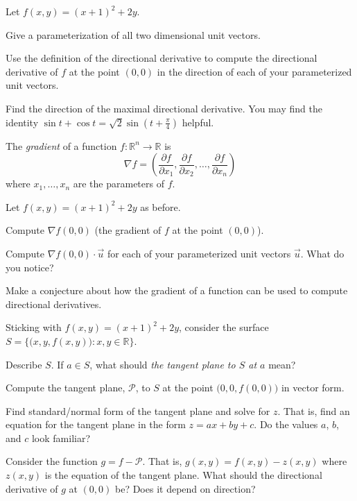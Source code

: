 \documentclass{problemset}
\newcommand{\R}{\mathbb{R}}
\begin{document}
	\question
	Let $f(x,y) = (x+1)^2+2y$.
	\begin{parts}
		\item Give a parameterization of all two dimensional unit vectors.
		\item Use the definition of the directional derivative to compute
			the directional derivative of $f$ at the point $(0,0)$ in the
			direction of each of your parameterized unit vectors.
		\item Find the direction of the maximal directional derivative.  You
			may find the identity $\sin t+\cos t = \sqrt{2}\sin(t+\tfrac{\pi}{4})$
			helpful.
	\end{parts}

	\begin{definition}[Gradient]
		The \emph{gradient} of a function $f:\R^n\to \R$ is
		\[
			\nabla f  = \left(
				\frac{\partial f}{\partial x_1}, 
				\frac{\partial f}{\partial x_2}, \ldots,
				\frac{\partial f}{\partial x_n}
			\right)
		\]
		where $x_1,\ldots, x_n$ are the parameters of $f$.
	\end{definition}
	
	\question
	Let $f(x,y) = (x+1)^2+2y$ as before.
	\begin{parts}
		\item Compute $\nabla f(0,0)$ (the gradient of $f$ at the point $(0,0)$).
		\item Compute $\nabla f(0,0)\cdot \vec u$ for each of your parameterized unit vectors $\vec u$.
			What do you notice?
		\item Make a conjecture about how the gradient of a function can be used to compute directional derivatives.
	\end{parts}

	\question
	Sticking with $f(x,y) = (x+1)^2+2y$, consider the surface $S=\{\big(x,y,f(x,y)\big):x,y\in\R\}$.
	\begin{parts}
		\item Describe $S$.  If $a\in S$, what should \emph{the tangent plane to $S$ at $a$} mean?
		\item Compute the tangent plane, $\mathcal P$, to $S$ at the point $\big(0,0,f(0,0)\big)$ in vector form.
		\item Find standard/normal form of the tangent plane and solve for $z$.  That is,
			find an equation for the tangent plane in the form $z=ax+by+c$.  Do the values $a$, $b$, and
			$c$ look familiar?
		\item Consider the function $g=f-\mathcal P$.  That is, $g(x,y)=f(x,y)-z(x,y)$ where $z(x,y)$ is the
			equation of the tangent plane.  What should the directional derivative of $g$ at $(0,0)$ be?
			Does it depend on direction?
	\end{parts}
\end{document}
